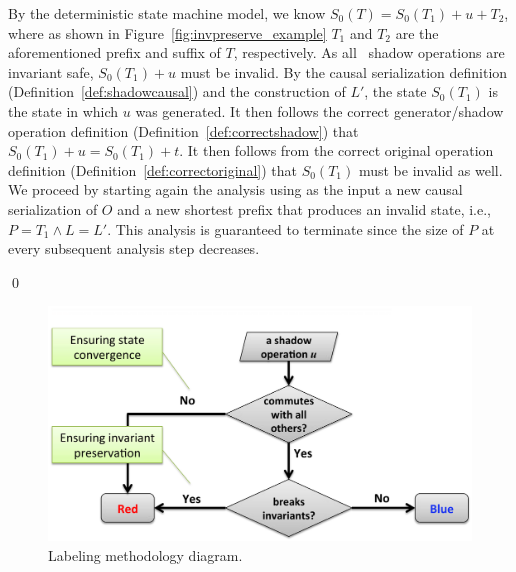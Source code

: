 \begin{itemize}
\begin{itemize}
By the deterministic state machine model, we know
$S_0(T) = S_0(T_1) + u + T_2$, where as shown in Figure~\ref{fig:invpreserve_example}
$T_1$ and $T_2$ are the aforementioned prefix and suffix of $T$, respectively. As all \blue\
shadow operations are invariant safe, $S_0(T_1) + u$ must be invalid.
By the causal serialization definition (Definition~\ref{def:shadowcausal})
and the construction of $L'$, the state $S_0(T_1)$ is the state 
in which $u$ was generated. It then follows the correct generator/shadow operation
definition (Definition~\ref{def:correctshadow}) that $S_0(T_1) + u = S_0(T_1) + t$. It then follows
from the correct original operation definition (Definition~\ref{def:correctoriginal}) that $S_0(T_1)$ must be invalid as well. 
We proceed by starting again the analysis using as the input a new causal serialization
of $O$ and a new shortest prefix that produces an invalid state, i.e., $P=T_1 \wedge L = L'$.
This analysis is guaranteed to terminate since the size of $P$ at every subsequent analysis step
decreases.
\end{itemize}
\end{itemize}
\qed

\begin{figure}[t!]
\centering
\includegraphics[width=0.86\columnwidth]{figures/redblue/principle_diagram.pdf}
\caption{Labeling methodology diagram.}
\label{fig:redbluelabeling}
\end{figure}


